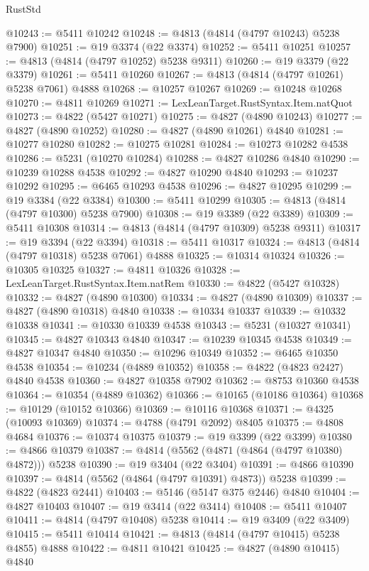 \begin{lexlean}{RustStd}
\begin{coremodule}
@10243 := @5411 @10242
@10248 := @4813 (@4814 (@4797 @10243) @5238 @7900)
@10251 := @19 @3374 (@22 @3374)
@10252 := @5411 @10251
@10257 := @4813 (@4814 (@4797 @10252) @5238 @9311)
@10260 := @19 @3379 (@22 @3379)
@10261 := @5411 @10260
@10267 := @4813 (@4814 (@4797 @10261) @5238 @7061) @4888
@10268 := @10257 @10267
@10269 := @10248 @10268
@10270 := @4811 @10269
@10271 := LexLeanTarget.RustSyntax.Item.natQuot
@10273 := @4822 (@5427 @10271)
@10275 := @4827 (@4890 @10243)
@10277 := @4827 (@4890 @10252)
@10280 := @4827 (@4890 @10261) @4840
@10281 := @10277 @10280
@10282 := @10275 @10281
@10284 := @10273 @10282 @4538
@10286 := @5231 (@10270 @10284)
@10288 := @4827 @10286 @4840
@10290 := @10239 @10288 @4538
@10292 := @4827 @10290 @4840
@10293 := @10237 @10292
@10295 := @6465 @10293 @4538
@10296 := @4827 @10295
@10299 := @19 @3384 (@22 @3384)
@10300 := @5411 @10299
@10305 := @4813 (@4814 (@4797 @10300) @5238 @7900)
@10308 := @19 @3389 (@22 @3389)
@10309 := @5411 @10308
@10314 := @4813 (@4814 (@4797 @10309) @5238 @9311)
@10317 := @19 @3394 (@22 @3394)
@10318 := @5411 @10317
@10324 := @4813 (@4814 (@4797 @10318) @5238 @7061) @4888
@10325 := @10314 @10324
@10326 := @10305 @10325
@10327 := @4811 @10326
@10328 := LexLeanTarget.RustSyntax.Item.natRem
@10330 := @4822 (@5427 @10328)
@10332 := @4827 (@4890 @10300)
@10334 := @4827 (@4890 @10309)
@10337 := @4827 (@4890 @10318) @4840
@10338 := @10334 @10337
@10339 := @10332 @10338
@10341 := @10330 @10339 @4538
@10343 := @5231 (@10327 @10341)
@10345 := @4827 @10343 @4840
@10347 := @10239 @10345 @4538
@10349 := @4827 @10347 @4840
@10350 := @10296 @10349
@10352 := @6465 @10350 @4538
@10354 := @10234 (@4889 @10352)
@10358 := @4822 (@4823 @2427) @4840 @4538
@10360 := @4827 @10358 @7902
@10362 := @8753 @10360 @4538
@10364 := @10354 (@4889 @10362)
@10366 := @10165 (@10186 @10364)
@10368 := @10129 (@10152 @10366)
@10369 := @10116 @10368
@10371 := @4325 (@10093 @10369)
@10374 := @4788 (@4791 @2092) @8405
@10375 := @4808 @4684
@10376 := @10374 @10375
@10379 := @19 @3399 (@22 @3399)
@10380 := @4866 @10379
@10387 := @4814 (@5562 (@4871 (@4864 (@4797 @10380) @4872))) @5238
@10390 := @19 @3404 (@22 @3404)
@10391 := @4866 @10390
@10397 := @4814 (@5562 (@4864 (@4797 @10391) @4873)) @5238
@10399 := @4822 (@4823 @2441)
@10403 := @5146 (@5147 @375 @2446) @4840
@10404 := @4827 @10403
@10407 := @19 @3414 (@22 @3414)
@10408 := @5411 @10407
@10411 := @4814 (@4797 @10408) @5238
@10414 := @19 @3409 (@22 @3409)
@10415 := @5411 @10414
@10421 := @4813 (@4814 (@4797 @10415) @5238 @4855) @4888
@10422 := @4811 @10421
@10425 := @4827 (@4890 @10415) @4840

\end{coremodule}
\end{lexlean}
